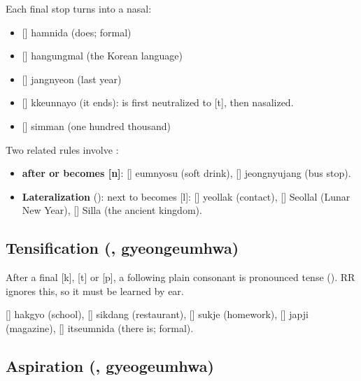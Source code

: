 \begin{example}[Nasalization]
Each final stop turns into a nasal:
\begin{itemize}
  \item {} [] hamnida (does; formal)
  \item {} [] hangungmal (the Korean language)
  \item {} [] jangnyeon (last year)
  \item {} [] kkeunnayo (it ends):  is first neutralized to
        [t], then nasalized.
  \item {} [] simman (one hundred thousand)
\end{itemize}
\end{example}

Two related rules involve :
\begin{itemize}
  \item \textbf{ after  or  becomes [n]}: 
        [] eumnyosu (soft drink),  [] jeongnyujang (bus
        stop).
  \item \textbf{Lateralization} ():  next to  becomes [l]:
         [] yeollak (contact),  [] Seollal (Lunar New
        Year),  [] Silla (the ancient kingdom).
\end{itemize}

\subsection{Tensification (, gyeongeumhwa)}

After a final [k], [t] or [p], a following plain consonant  is
pronounced tense (). RR ignores this, so it must be learned by ear.

\begin{example}[Tensification]
 [] hakgyo (school),  [] sikdang (restaurant),
 [] sukje (homework),  [] japji (magazine),
 [] itseumnida (there is; formal).
\end{example}

\subsection{Aspiration (, gyeogeumhwa)}

